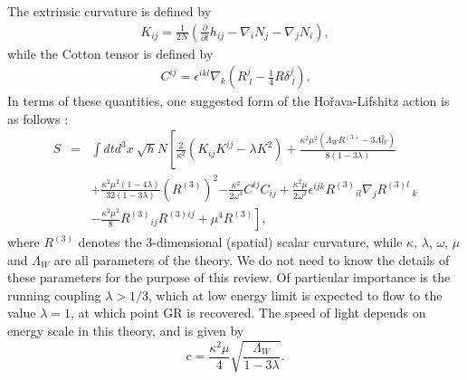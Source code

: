 \documentclass[12pt]{article}
\newcommand{\2}{$^2$}
\newcommand{\3}{$^3$}
\newcommand{\4}{$_4$}
\newcommand{\5}{$_5$}
\begin{document}
\begin{description}
The extrinsic curvature is defined by
\begin{eqnarray}
K_{ij} = \frac{1}{2N} \left( \frac{\partial}{\partial t} h_{ij} - \nabla_{i}N_{j} - \nabla_{j}N_{i} \right),
\end{eqnarray}
while the Cotton tensor is defined by
\begin{eqnarray}
C^{ij} = \epsilon^{ikl} \nabla_{k} \left( R^{j}_{\;l} - \frac{1}{4} R \delta^{j}_{\;l} \right).
\end{eqnarray}
In terms of these quantities, one suggested form of the Ho\v{r}ava-Lifshitz action is as follows \cite{Horava:2009uw}:
\begin{eqnarray}
S &=& \int dt d^{3}x~ \sqrt{h}N \left[ \frac{2}{\kappa^{2}} \left( K_{ij}K^{ij} - \lambda K^{2} \right) + \frac{\kappa^{2}\mu^{2} (\Lambda_{W} R^{(3)} - 3 \Lambda_{W}^{2})}{8 (1-3\lambda)} \right. \nonumber\\
&&+ \frac{\kappa^{2}\mu^{2}(1-4\lambda)}{32(1-3\lambda)} \left(R^{(3)}\right)^{2}\left. - \frac{\kappa^{2}}{2\omega^{4}} C^{ij}C_{ij} + \frac{\kappa^{2}\mu}{2\omega^{2}} \epsilon^{ijk}{R^{(3)}}_{il}\nabla_{j}{R^{(3)l}}_{\;k}  \right. \nonumber \\
&&- \left. \frac{\kappa^{2}\mu^{2}}{8} {R^{(3)}}_{ij} {R^{(3)ij}}+ \mu^{4} R^{(3)} \right],
\end{eqnarray}
where $R^{(3)}$ denotes the 3-dimensional (spatial) scalar curvature, while  $\kappa$, $\lambda$, $\omega$, $\mu$ and $\Lambda_W$ are all parameters of the theory. 
We do not need to know the details of these parameters for the purpose of this review.
Of particular importance is the running coupling $\lambda > 1/3$, which at low energy limit is expected to flow to the value $\lambda=1$, at which point GR is recovered. 
The speed of light depends on energy scale in this theory, and is given by
\begin{equation}
c=\frac{\kappa^2 \mu}{4}\sqrt{\frac{\Lambda_W}{1-3\lambda}}.
\end{equation}


\end{description}
\end{document}
